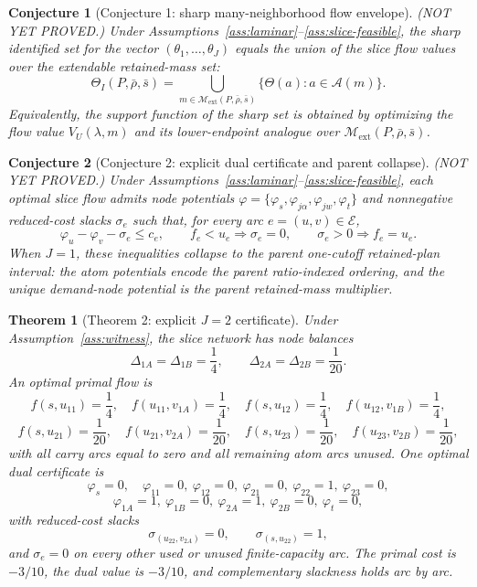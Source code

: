 \documentclass[11pt]{article}
\newcommand{\calA}{\mathcal{A}}
\newcommand{\calM}{\mathcal{M}}
\newcommand{\calE}{\mathcal{E}}
\theoremstyle{definition}
\theoremstyle{plain}
\newtheorem{theorem}{Theorem}
\newtheorem{conjecture}{Conjecture}
\theoremstyle{remark}
\begin{document}
\begin{conjecture}[Conjecture 1: sharp many-neighborhood flow envelope]\label{conj:sharp-envelope}
(NOT YET PROVED.) Under Assumptions~\ref{ass:laminar}--\ref{ass:slice-feasible}, the sharp
identified set for the vector \((\theta_1,\ldots,\theta_J)\) equals the union of the slice
flow values over the extendable retained-mass set:
\[
\Theta_I(P,\bar\rho,\bar s)
=
\bigcup_{m\in\calM_{\mathrm{ext}}(P,\bar\rho,\bar s)}
\{\Theta(a):a\in\calA(m)\}.
\]
Equivalently, the support function of the sharp set is obtained by optimizing the flow
value \(V_U(\lambda,m)\) and its lower-endpoint analogue over
\(\calM_{\mathrm{ext}}(P,\bar\rho,\bar s)\).
\end{conjecture}

\begin{conjecture}[Conjecture 2: explicit dual certificate and parent collapse]\label{conj:dual}
(NOT YET PROVED.) Under Assumptions~\ref{ass:laminar}--\ref{ass:slice-feasible}, each
optimal slice flow admits node potentials
\(\varphi=\{\varphi_s,\varphi_{j\alpha},\varphi_{jw},\varphi_t\}\) and nonnegative
reduced-cost slacks \(\sigma_e\) such that, for every arc \(e=(u,v)\in\calE\),
\[
\varphi_u-\varphi_v-\sigma_e\le c_e,
\qquad
f_e<u_e\Rightarrow \sigma_e=0,
\qquad
\sigma_e>0\Rightarrow f_e=u_e.
\]
When \(J=1\), these inequalities collapse to the parent one-cutoff retained-plan interval:
the atom potentials encode the parent ratio-indexed ordering, and the unique demand-node
potential is the parent retained-mass multiplier.
\end{conjecture}

\begin{theorem}[Theorem 2: explicit \(J=2\) certificate]\label{thm:witness}
Under Assumption~\ref{ass:witness}, the slice network has node balances
\[
\Delta_{1A}=\Delta_{1B}=\frac14,\qquad
\Delta_{2A}=\Delta_{2B}=\frac1{20}.
\]
An optimal primal flow is
\[
f(s,u_{11})=\frac14,\quad f(u_{11},v_{1A})=\frac14,\quad
f(s,u_{12})=\frac14,\quad f(u_{12},v_{1B})=\frac14,
\]
\[
f(s,u_{21})=\frac1{20},\quad f(u_{21},v_{2A})=\frac1{20},\quad
f(s,u_{23})=\frac1{20},\quad f(u_{23},v_{2B})=\frac1{20},
\]
with all carry arcs equal to zero and all remaining atom arcs unused. One optimal dual
certificate is
\[
\varphi_s=0,\quad
\varphi_{11}=0,\ \varphi_{12}=0,\ \varphi_{21}=0,\ \varphi_{22}=1,\ \varphi_{23}=0,
\]
\[
\varphi_{1A}=1,\ \varphi_{1B}=0,\ \varphi_{2A}=1,\ \varphi_{2B}=0,\ \varphi_t=0,
\]
with reduced-cost slacks
\[
\sigma_{(u_{22},v_{2A})}=0,\qquad
\sigma_{(s,u_{22})}=1,
\]
and \(\sigma_e=0\) on every other used or unused finite-capacity arc. The primal cost is
\(-3/10\), the dual value is \(-3/10\), and complementary slackness holds arc by arc.
\end{theorem}
\end{document}
